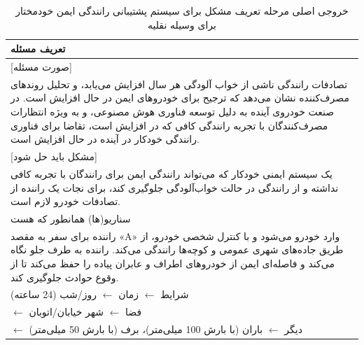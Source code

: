 \documentclass[a4paper,10pt]{article}
\begin{document}
    \begin{table}[htbp]

        \centering
        \caption{خروجی اصلی مرحله تعریف مشکل برای سیستم پشتیبانی رانندگی ایمن خودمختار برای وسیله نقلیه}
        \begin{tabularx}{\textwidth}{X}

            \hline

            تعریف مسئله \\

            \hline

            [صورت مسئله] \\

            تصادفات رانندگی ناشی از خواب آلودگی هر سال افزایش می‌یابد، و تحلیل روندهای مصرف‌کننده نشان می‌دهد که ترجیح برای خودروهای ایمن در حال افزایش است. در صنعت خودروی آینده به دلیل توسعه فناوری هوش مصنوعی، و به ویژه انتظارات مصرف‌کنندگان با تجربه رانندگی کافی که در افزایش است، تقاضا برای فناوری رانندگی خودکار در آینده در حال افزایش است. \\

            [مشکل باید حل شود] \\

            یک سیستم ایمنی خودکار که می‌تواند رانندگی ایمن برای رانندگان با تجربه کافی نداشته و از رانندگی در حالت خواب‌آلودگی جلوگیری کند، برای نجات یک راننده از تصادفات خودرو لازم است. \\

            \hline

            سناریو(ها) همانطور که هست \\

            \hline

            راننده برای سفر به مقصد «A» وارد خودرو می‌شود و با کنترل شخصی خودرو، از طریق جاده‌های شهری عمومی و کوچه‌ها رانندگی می‌کند. راننده به طرف جلو نگاه می‌کند و فاصله‌ای ایمن از خودروهای اطراف و عابران پیاده را حفظ می‌کند تا از وقوع حوادث جلوگیری کند. \\  

            شرایط $\leftarrow$ زمان $\leftarrow$ روز/شب (24 ساعته) \\
            \hspace{24pt} $\leftarrow$ فضا $\leftarrow$ شهر خیابان/اتوبان \\
            \hspace{24pt} $\leftarrow$ دیگر $\leftarrow$ باران (با بارش 100 میلی‌متر)، برف (با بارش 50 میلی‌متر) \\

            \hline
            

\end{tabularx}
\end{table}
\end{document}
